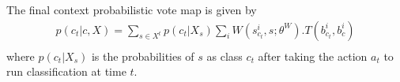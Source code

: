 The final context probabilistic vote map is given by
\begin{eqnarray}
p(c_t|c,X) = \sum_{s\in X^t} p(c_t|X_s)\sum_i W(s_{c_t}^i,s;\theta^W).T(b_{c_t}^i,b_c^i)\nonumber\\
\end{eqnarray}
where $p(c_t|X_s)$ is the probabilities of $s$ as class $c_t$ after taking the action $a_t$ to run classification at time $t$.


